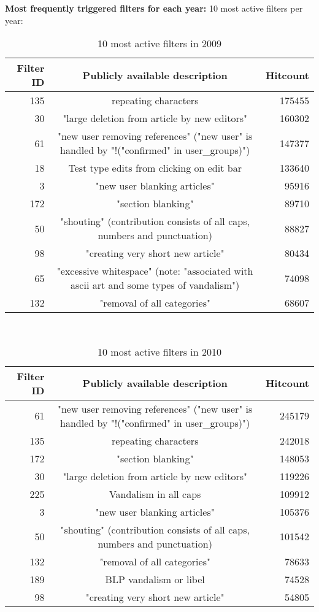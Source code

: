 \textbf{Most frequently triggered filters for each year:}
10 most active filters per year:
\begin{table}
  \centering
  \begin{tabular}{r c r }
    Filter ID & Publicly available description & Hitcount \\ %
    \hline
    135 & repeating characters & 175455 \\
    30 & "large deletion from article by new editors" & 160302 \\
    61 & "new user removing references" ("new user" is handled by "!("confirmed" in user\_groups)") & 147377 \\
    18 & Test type edits from clicking on edit bar & 133640 \\
    3 & "new user blanking articles" & 95916 \\
    172 & "section blanking" & 89710 \\
    50 & "shouting" (contribution consists of all caps, numbers and punctuation) & 88827 \\
    98 & "creating very short new article" & 80434 \\
    65 & "excessive whitespace" (note: "associated with ascii art and some types of vandalism") & 74098 \\
    132 & "removal of all categories" & 68607 \\
  \end{tabular}
  \caption{10 most active filters in 2009}~\label{tab:most-active-2009}
\end{table}

\begin{table}
  \centering
  \begin{tabular}{r c r }
    Filter ID & Publicly available description & Hitcount \\
    \hline
    61 & "new user removing references" ("new user" is handled by "!("confirmed" in user\_groups)") & 245179 \\
    135 & repeating characters & 242018 \\
    172 & "section blanking" & 148053 \\
    30 & "large deletion from article by new editors" & 119226 \\
    225 & Vandalism in all caps & 109912 \\
    3 & "new user blanking articles" & 105376 \\
    50 & "shouting" (contribution consists of all caps, numbers and punctuation) & 101542 \\
    132 & "removal of all categories" & 78633 \\
    189 & BLP vandalism or libel & 74528 \\
    98 & "creating very short new article" & 54805 \\
  \end{tabular}
  \caption{10 most active filters in 2010}~\label{tab:most-active-2010}
\end{table}

